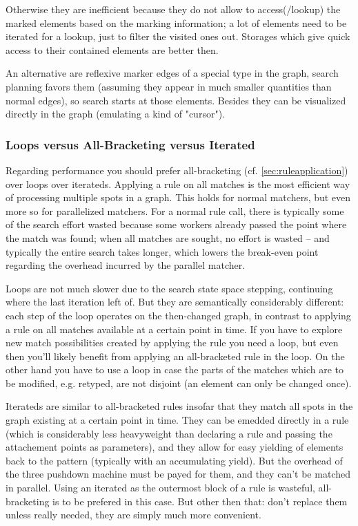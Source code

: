 Otherwise they are inefficient because they do not allow to access(/lookup) the marked elements based on the marking information;
a lot of elements need to be iterated for a lookup, just to filter the visited ones out.
Storages which give quick access to their contained elements are better then.

An alternative are reflexive marker edges of a special type in the graph, search planning favors them (assuming they appear in much smaller quantities than normal edges),  so search starts at those elements. 
Besides they can be visualized directly in the graph (emulating a kind of "cursor").

\subsubsection*{Loops versus All-Bracketing versus Iterated}
Regarding performance you should prefer all-bracketing (cf. \ref{sec:ruleapplication}) over loops over iterateds.
Applying a rule on all matches is the most efficient way of processing multiple spots in a graph.
This holds for normal matchers, but even more so for parallelized matchers.
For a normal rule call, there is typically some of the search effort wasted because some workers already passed the point where the match was found; when all matches are sought, no effort is wasted -- and typically the entire search takes longer, which lowers the break-even point regarding the overhead incurred by the parallel matcher.

Loops are not much slower due to the search state space stepping, continuing where the last iteration left of.
But they are semantically considerably different: each step of the loop operates on the then-changed graph, in contrast to applying a rule on all matches available at a certain point in time.
If you have to explore new match possibilities created by applying the rule you need a loop, but even then you'll likely benefit from applying an all-bracketed rule in the loop.
On the other hand you have to use a loop in case the parts of the matches which are to be modified, e.g. retyped, are not disjoint (an element can only be changed once).

Iterateds are similar to all-bracketed rules insofar that they match all spots in the graph existing at a certain point in time.
They can be emedded directly in a rule (which is considerably less heavyweight than declaring a rule and passing the attachement points as parameters), and they allow for easy yielding of elements back to the pattern (typically with an accumulating yield).
But the overhead of the three pushdown machine must be payed for them, and they can't be matched in parallel.
Using an iterated as the outermost block of a rule is wasteful, all-bracketing is to be prefered in this case.
But other then that: don't replace them unless really needed, they are simply much more convenient.

